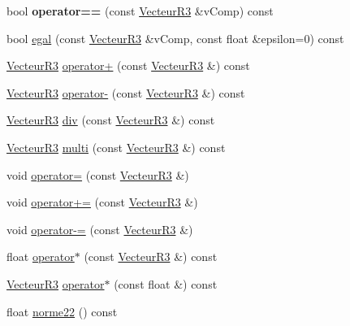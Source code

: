 \begin{DoxyCompactItemize}
\item 
\mbox{\label{class_vecteur_r3_a0372c4411592d0a3adb4cf052e1b098d}} 
bool {\bfseries operator==} (const \mbox{\hyperlink{class_vecteur_r3}{Vecteur\+R3}} \&v\+Comp) const
\item 
bool \mbox{\hyperlink{class_vecteur_r3_a3e37c4a2e567844b4c32bede3f1b357e}{egal}} (const \mbox{\hyperlink{class_vecteur_r3}{Vecteur\+R3}} \&v\+Comp, const float \&epsilon=0) const
\item 
\mbox{\hyperlink{class_vecteur_r3}{Vecteur\+R3}} \mbox{\hyperlink{class_vecteur_r3_a00f29db8de9383f6627da7053c2c9af4}{operator+}} (const \mbox{\hyperlink{class_vecteur_r3}{Vecteur\+R3}} \&) const
\item 
\mbox{\hyperlink{class_vecteur_r3}{Vecteur\+R3}} \mbox{\hyperlink{class_vecteur_r3_a1a041eb37d796dcbb6e9a4d67df2e364}{operator-\/}} (const \mbox{\hyperlink{class_vecteur_r3}{Vecteur\+R3}} \&) const
\item 
\mbox{\hyperlink{class_vecteur_r3}{Vecteur\+R3}} \mbox{\hyperlink{class_vecteur_r3_adba111a3a9795f2cbeaa01efb99bb368}{div}} (const \mbox{\hyperlink{class_vecteur_r3}{Vecteur\+R3}} \&) const
\item 
\mbox{\hyperlink{class_vecteur_r3}{Vecteur\+R3}} \mbox{\hyperlink{class_vecteur_r3_ad03b38659a6e2454727487afb8842f0d}{multi}} (const \mbox{\hyperlink{class_vecteur_r3}{Vecteur\+R3}} \&) const
\item 
void \mbox{\hyperlink{class_vecteur_r3_ab001030cf179f0b78c4b57366132a87c}{operator=}} (const \mbox{\hyperlink{class_vecteur_r3}{Vecteur\+R3}} \&)
\item 
void \mbox{\hyperlink{class_vecteur_r3_ab50dc680b31f24957d39c60b63b71daf}{operator+=}} (const \mbox{\hyperlink{class_vecteur_r3}{Vecteur\+R3}} \&)
\item 
void \mbox{\hyperlink{class_vecteur_r3_a4cda50fa8f9233ed982d01b855cd6782}{operator-\/=}} (const \mbox{\hyperlink{class_vecteur_r3}{Vecteur\+R3}} \&)
\item 
float \mbox{\hyperlink{class_vecteur_r3_adba51a9c03c057ddafd76d4e62de3866}{operator$\ast$}} (const \mbox{\hyperlink{class_vecteur_r3}{Vecteur\+R3}} \&) const
\item 
\mbox{\hyperlink{class_vecteur_r3}{Vecteur\+R3}} \mbox{\hyperlink{class_vecteur_r3_a359b0ad02e7e539d32657d9722c620a6}{operator$\ast$}} (const float \&) const
\item 
float \mbox{\hyperlink{class_vecteur_r3_a014e36cfadce987c292edcf1db615cfd}{norme22}} () const

\end{DoxyCompactItemize}
